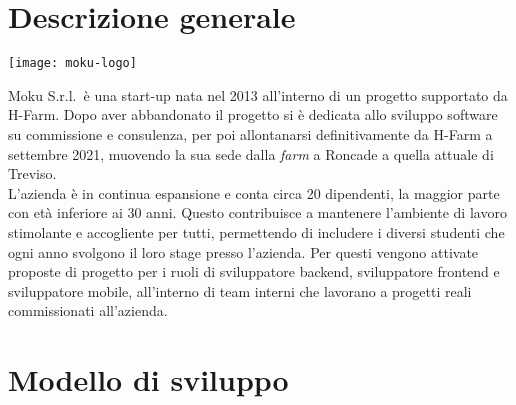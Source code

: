 \section{Descrizione generale}

\begin{center}
	\texttt{[image: moku-logo]}
\end{center}
Moku S.r.l.\ è una start-up nata nel 2013 all'interno di un progetto supportato da H-Farm. Dopo aver abbandonato il progetto si è dedicata allo sviluppo software su commissione e consulenza, per poi allontanarsi definitivamente da H-Farm a settembre 2021, muovendo la sua sede dalla \emph{farm} a Roncade a quella attuale di Treviso. \\
L'azienda è in continua espansione e conta circa 20 dipendenti, la maggior parte con età inferiore ai 30 anni. Questo contribuisce a mantenere l'ambiente di lavoro stimolante e accogliente per tutti, permettendo di includere i diversi studenti che ogni anno svolgono il loro stage presso l'azienda. Per questi vengono attivate proposte di progetto per i ruoli di sviluppatore backend, sviluppatore frontend e sviluppatore mobile, all'interno di team interni che lavorano a progetti reali commissionati all'azienda.

\section{Modello di sviluppo}
